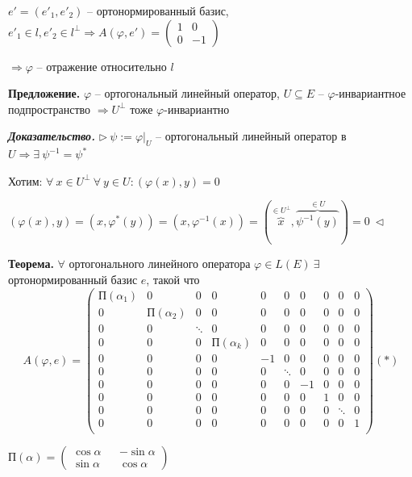 $e' = (e'_1, e'_2)$ -- ортонормированный базис, $e'_1 \in l, e'_2 \in l^{\bot} \Rightarrow A(\varphi, e') = \begin{pmatrix} 1 & 0 \\ 0 & -1 \end{pmatrix}$

$\Rightarrow \varphi$ -- отражение относительно $l$

\vspace{\baselineskip}
\textbf{Предложение.} $\varphi$ -- ортогональный линейный оператор, $U \subseteq E$ -- $\varphi$-инвариантное подпространство $\Rightarrow U^{\bot}$ тоже $\varphi$-инвариантно

\vspace{\baselineskip}
\textbf{\textit{Доказательство.}} $\rhd \ \psi := \varphi|_{U}$ -- ортогональный линейный оператор в $U \Rightarrow \exists \ \psi^{-1} = \psi^*$

Хотим: $\forall \ x \in U^{\bot} \ \forall \ y \in U: (\varphi(x), y) = 0$

$(\varphi(x), y) = (x, \varphi^*(y)) = (x, \varphi^{-1}(x)) = (\overbrace{x}^{\in U^{\bot}}, \overbrace{\psi^{-1}(y)}^{\in U}) = 0 \ \lhd$

\vspace{\baselineskip}
\textbf{Теорема.} $\forall$ ортогонального линейного оператора $\varphi \in L(E) \ \exists$ ортонормированный базис $e$, такой что \[A(\varphi, e) = \left(
\begin{array}{c|c|c|c|c|c|c|c|c|c}
  П(\alpha_1) & 0 & 0 & 0 & 0 & 0 & 0 & 0 & 0 & 0  \\
  \hline
  0 & П(\alpha_2) & 0 & 0 & 0 & 0 & 0 & 0 & 0 & 0  \\
  \hline
  0 & 0 & \ddots & 0 & 0 & 0 & 0 & 0 & 0 & 0  \\
  \hline
  0 & 0 & 0 & П(\alpha_k) & 0 & 0 & 0 & 0 & 0 & 0 \\
  \hline
  0 & 0 & 0 & 0 & -1 & 0 & 0 & 0 & 0 & 0 \\
  \hline
  0 & 0 & 0 & 0 & 0 & \ddots & 0 & 0 & 0 & 0 \\
  \hline
  0 & 0 & 0 & 0 & 0 & 0 & -1 & 0 & 0 & 0 \\
  \hline
  0 & 0 & 0 & 0 & 0 & 0 & 0 & 1 & 0 & 0 \\
  \hline
  0 & 0 & 0 & 0 & 0 & 0 & 0 & 0 & \ddots & 0 \\
  \hline
  0 & 0 & 0 & 0 & 0 & 0 & 0 & 0 & 0 & 1 \\
\end{array}
\right) (*)\]

$П(\alpha) = \begin{pmatrix} \cos \alpha && -\sin \alpha \\ \sin \alpha && \cos \alpha \end{pmatrix}$

